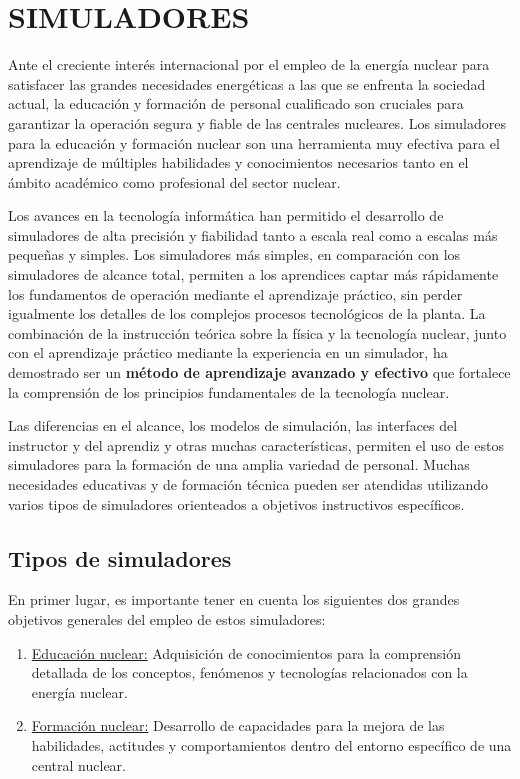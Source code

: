\newpage
\section{SIMULADORES} \label{simuladores}

Ante el creciente interés internacional por el empleo de la energía nuclear para satisfacer las grandes necesidades energéticas a las que se enfrenta la sociedad actual, la educación y formación de personal cualificado son cruciales para garantizar la operación segura y fiable de las centrales nucleares. Los simuladores para la educación y formación nuclear son una herramienta muy efectiva para el aprendizaje de múltiples habilidades y conocimientos necesarios tanto en el ámbito académico como profesional del sector nuclear.

Los avances en la tecnología informática han permitido el desarrollo de simuladores de alta precisión y fiabilidad tanto a escala real como a escalas más pequeñas y simples. Los simuladores más simples, en comparación con los simuladores de alcance total, permiten a los aprendices captar más rápidamente los fundamentos de operación mediante el aprendizaje práctico, sin perder igualmente los detalles de los complejos procesos tecnológicos de la planta. La combinación de la instrucción teórica sobre la física y la tecnología nuclear, junto con el aprendizaje práctico mediante la experiencia en un simulador, ha demostrado ser un \textbf{método de aprendizaje avanzado y efectivo} que fortalece la comprensión de los principios fundamentales de la tecnología nuclear. 

Las diferencias en el alcance, los modelos de simulación, las interfaces del instructor y del aprendiz y otras muchas características, permiten el uso de estos simuladores para la formación de una amplia variedad de personal. Muchas necesidades educativas y de formación técnica pueden ser atendidas utilizando varios tipos de simuladores orienteados a objetivos instructivos específicos.

\subsection{Tipos de simuladores}

En primer lugar, es importante tener en cuenta los siguientes dos grandes objetivos generales del empleo de estos simuladores:

\begin{enumerate}
  \item \underline{Educación nuclear:} Adquisición de conocimientos para la comprensión detallada de los conceptos, fenómenos y tecnologías relacionados con la energía nuclear.
  \item \underline{Formación nuclear:} Desarrollo de capacidades para la mejora de las habilidades, actitudes y comportamientos dentro del entorno específico de una central nuclear.
\end{enumerate}

